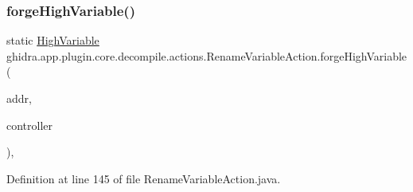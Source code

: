 \subsubsection{\texorpdfstring{forgeHighVariable()}{forgeHighVariable()}}
{\footnotesize\ttfamily static \mbox{\hyperlink{class_high_variable}{High\+Variable}} ghidra.\+app.\+plugin.\+core.\+decompile.\+actions.\+Rename\+Variable\+Action.\+forge\+High\+Variable (\begin{DoxyParamCaption}\item[{\mbox{\hyperlink{class_address}{Address}}}]{addr,  }\item[{\mbox{\hyperlink{classghidra_1_1app_1_1decompiler_1_1component_1_1_decompiler_controller}{Decompiler\+Controller}}}]{controller }\end{DoxyParamCaption})\hspace{0.3cm}{\ttfamily [inline]}, {\ttfamily [static]}}



Definition at line 145 of file Rename\+Variable\+Action.\+java.

